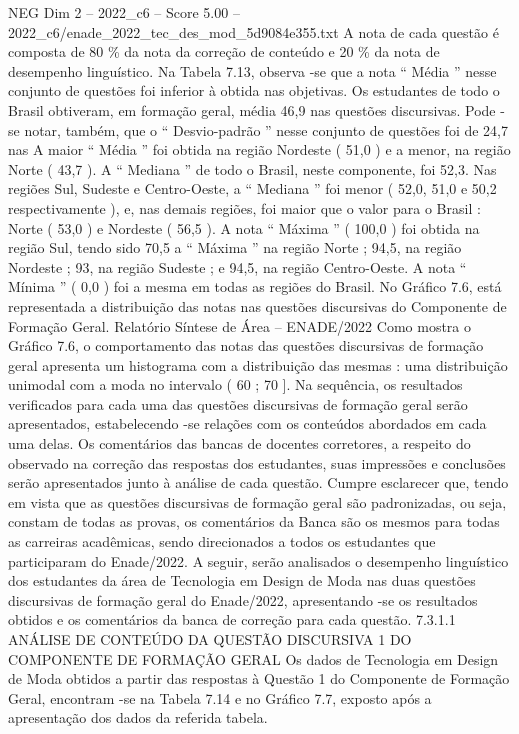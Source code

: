 \begin{textsample}{NEG Dim 2 – 2022\_c6 – Score 5.00 – 2022\_c6/enade\_2022\_tec\_des\_mod\_5d9084e355.txt}
A nota de cada questão é composta de 80 \% da nota da correção de conteúdo e 20 \% da nota de desempenho linguístico.
Na Tabela 7.13, observa -se que a nota “ Média ” nesse conjunto de questões foi inferior à obtida nas objetivas.
Os estudantes de todo o Brasil obtiveram, em formação geral, média 46,9 nas questões discursivas.
Pode -se notar, também, que o “ Desvio-padrão ” nesse conjunto de questões foi de 24,7 nas A maior “ Média ” foi obtida na região Nordeste ( 51,0 ) e a menor, na região Norte ( 43,7 ).
A “ Mediana ” de todo o Brasil, neste componente, foi 52,3.
Nas regiões Sul, Sudeste e Centro-Oeste, a “ Mediana ” foi menor ( 52,0, 51,0 e 50,2 respectivamente ), e, nas demais regiões, foi maior que o valor para o Brasil : Norte ( 53,0 ) e Nordeste ( 56,5 ).
A nota “ Máxima ” ( 100,0 ) foi obtida na região Sul, tendo sido 70,5 a “ Máxima ” na região Norte ; 94,5, na região Nordeste ; 93, na região Sudeste ; e 94,5, na região Centro-Oeste.
A nota “ Mínima ” ( 0,0 ) foi a mesma em todas as regiões do Brasil.
No Gráfico 7.6, está representada a distribuição das notas nas questões discursivas do Componente de Formação Geral.
Relatório Síntese de Área – ENADE/2022 Como mostra o Gráfico 7.6, o comportamento das notas das questões discursivas de formação geral apresenta um histograma com a distribuição das mesmas : uma distribuição unimodal com a moda no intervalo ( 60 ; 70 ].
Na sequência, os resultados verificados para cada uma das questões discursivas de formação geral serão apresentados, estabelecendo -se relações com os conteúdos abordados em cada uma delas.
Os comentários das bancas de docentes corretores, a respeito do observado na correção das respostas dos estudantes, suas impressões e conclusões serão apresentados junto à análise de cada questão.
Cumpre esclarecer que, tendo em vista que as questões discursivas de formação geral são padronizadas, ou seja, constam de todas as provas, os comentários da Banca são os mesmos para todas as carreiras acadêmicas, sendo direcionados a todos os estudantes que participaram do Enade/2022.
A seguir, serão analisados o desempenho linguístico dos estudantes da área de Tecnologia em Design de Moda nas duas questões discursivas de formação geral do Enade/2022, apresentando -se os resultados obtidos e os comentários da banca de correção para cada questão. 7.3.1.1 ANÁLISE DE CONTEÚDO DA QUESTÃO DISCURSIVA 1 DO COMPONENTE DE FORMAÇÃO GERAL Os dados de Tecnologia em Design de Moda obtidos a partir das respostas à Questão 1 do Componente de Formação Geral, encontram -se na Tabela 7.14 e no Gráfico 7.7, exposto após a apresentação dos dados da referida tabela.

\end{textsample}
